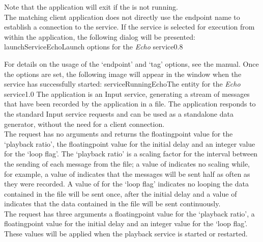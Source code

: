 Note that the application will exit if the  is not
running.\\

\insertAutoAppParameters
{}
The matching client application does not directly use the endpoint name to establish a
connection to the service.
\condPage
If the service is selected for execution from within the \emph{\MMMU} application, the
following dialog will be presented:
%
{launchServiceEcho}{Launch options for the \emph{Echo} service}{0.8}

For details on the usage of the `endpoint' and `tag' options, see the \emph{\MMMU} manual.
Once the options are set, the following image will appear in the \emph{\MMMU} window when
the service has successfully started:
%
{serviceRunningEcho}{The \emph{\MMMU} entity for the \emph{Echo} service}{1.0}
The  application is an Input
service, generating a stream of \yarp{} messages that have been recorded by the
 application in a file.
The application responds to the standard Input service requests and can be used as a
standalone data generator, without the need for a client connection.\\

The  request has no arguments and
returns the floating\longDash{}point value for the `playback ratio', the
floating\longDash{}point value for the initial delay and an integer value for the
`loop flag'.
The `playback ratio' is a scaling factor for the interval between the sending of each
message from the file; a value of  indicates no scaling while, for example,
a value of  indicates that the messages will be sent half as often as they
were recorded.
A value of  for the `loop flag' indicates no looping \longDash{} the data
contained in the file will be sent once, after the initial delay \longDash{} and a value
of  indicates that the data contained in the file will be sent
continuously.\\

The  request has three arguments
\longDash{} a floating\longDash{}point value for the `playback ratio', a
floating\longDash{}point value for the initial delay and an integer value for the
`loop flag'.
These values will be applied when the playback service is started or restarted.\\

